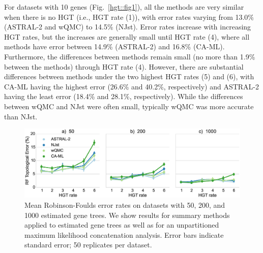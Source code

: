 For datasets with 10 genes (Fig.~\ref{hgt::fig1}), %
 all the methods are very similar when there is no HGT (i.e., HGT rate (1)), with error rates varying from 13.0\% (ASTRAL-2 and wQMC) to 14.5\% (NJst). Error rates increase with increasing HGT rates, but the increases
are generally small until HGT rate (4), where all methods have error between 14.9\%  (ASTRAL-2) and
16.8\% (CA-ML).   Furthermore,  the differences between methods remain small (no more than 1.9\% between the methods) through HGT rate (4).  However, there are substantial differences between methods under the two highest HGT rates (5) and (6),  with CA-ML having the highest error (26.6\% and 40.2\%, respectively) and ASTRAL-2 having the least error (18.4\% and 28.1\%, respectively). While the differences between wQMC and NJst were often small, typically wQMC was more accurate than NJst. 

  \begin{figure}[h!]
 \includegraphics[width=12cm]{hgt-figs/more-est-row.eps}
 \caption[Mean Robinson-Foulds error rates on 
datasets with 50, 200, and 1000 estimated gene trees]{{Mean Robinson-Foulds error rates on 
datasets with 50, 200, and 1000 estimated gene trees. }
We show results for summary methods 
applied to estimated gene trees as well as for an unpartitioned
maximum likelihood
concatenation analysis. Error bars indicate standard error; 
50 replicates per dataset. }
\label{hgt::fig2}
      \end{figure}

